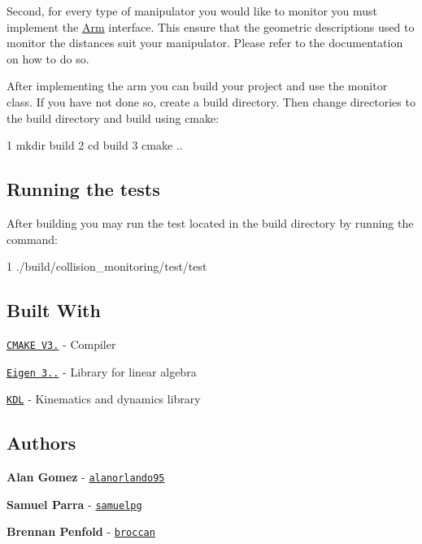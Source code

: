 Second, for every type of manipulator you would like to monitor you must implement the \hyperlink{class_arm}{Arm} interface. This ensure that the geometric descriptions used to monitor the distances suit your manipulator. Please refer to the documentation on how to do so.

After implementing the arm you can build your project and use the monitor class. If you have not done so, create a build directory. Then change directories to the build directory and build using cmake\+:


\begin{DoxyCode}
1 mkdir build
2 cd build
3 cmake ..
\end{DoxyCode}


\subsection*{Running the tests}

After building you may run the test located in the build directory by running the command\+:


\begin{DoxyCode}
1 ./build/collision\_monitoring/test/test
\end{DoxyCode}


\subsection*{Built With}


\begin{DoxyItemize}
\item \href{https://cmake.org/download/}{\tt C\+M\+A\+KE V3.} -\/ Compiler
\item \href{http://eigen.tuxfamily.org}{\tt Eigen 3..} -\/ Library for linear algebra
\item \href{https://www.orocos.org/kdl/installation-manual}{\tt K\+DL} -\/ Kinematics and dynamics library
\end{DoxyItemize}

\subsection*{Authors}


\begin{DoxyItemize}
\item {\bfseries Alan Gomez} -\/ \href{https://github.com/alanorlando95}{\tt alanorlando95}
\item {\bfseries Samuel Parra} -\/ \href{https://github.com/samuelpg}{\tt samuelpg}
\item {\bfseries Brennan Penfold} -\/ \href{https://github.com/broccan}{\tt broccan}
\end{DoxyItemize}

